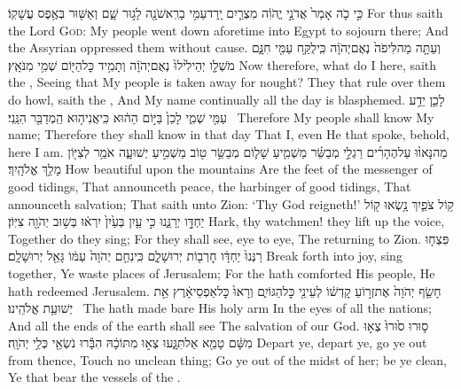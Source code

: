{כִּ֣י כֹ֤ה אָמַר֙ אֲדֹנָ֣י יֱהֹוִ֔ה מִצְרַ֛יִם יָֽרַד\maqqaf עַמִּ֥י בָרִֽאשֹׁנָ֖ה לָג֣וּר שָׁ֑ם וְאַשּׁ֖וּר בְּאֶ֥פֶס עֲשָׁקֽוֹ׃}
{For thus saith the Lord \textsc{God}: My people went down aforetime into Egypt to sojourn there; And the Assyrian oppressed them without cause.}
{וְעַתָּ֤ה מַה\maqqaf לִּי\maqqaf פֹה֙ נְאֻם\maqqaf יְהֹוָ֔ה כִּֽי\maqqaf לֻקַּ֥ח עַמִּ֖י חִנָּ֑ם מֹשְׁלָ֤ו יְהֵילִ֙ילוּ֙ נְאֻם\maqqaf יְהֹוָ֔ה וְתָמִ֥יד כׇּל\maqqaf הַיּ֖וֹם שְׁמִ֥י מִנֹּאָֽץ׃}
{Now therefore, what do I here, saith the \lord, Seeing that My people is taken away for nought? They that rule over them do howl, saith the \lord, And My name continually all the day is blasphemed.}
{לָכֵ֛ן יֵדַ֥ע עַמִּ֖י שְׁמִ֑י לָכֵן֙ בַּיּ֣וֹם הַה֔וּא כִּֽי\maqqaf אֲנִי\maqqaf ה֥וּא הַֽמְדַבֵּ֖ר הִנֵּֽנִי׃ \setuma }
{Therefore My people shall know My name; Therefore they shall know in that day That I, even He that spoke, behold, here I am.}
{מַה\maqqaf נָּאו֨וּ עַל\maqqaf הֶהָרִ֜ים רַגְלֵ֣י מְבַשֵּׂ֗ר מַשְׁמִ֧יעַ שָׁל֛וֹם מְבַשֵּׂ֥ר ט֖וֹב מַשְׁמִ֣יעַ יְשׁוּעָ֑ה אֹמֵ֥ר לְצִיּ֖וֹן מָלַ֥ךְ אֱלֹהָֽיִךְ׃}
{How beautiful upon the mountains Are the feet of the messenger of good tidings, That announceth peace, the harbinger of good tidings, That announceth salvation; That saith unto Zion: ‘Thy God reigneth!’}
{ק֥וֹל צֹפַ֛יִךְ נָ֥שְׂאוּ ק֖וֹל יַחְדָּ֣ו יְרַנֵּ֑נוּ כִּ֣י עַ֤יִן בְּעַ֙יִן֙ יִרְא֔וּ בְּשׁ֥וּב יְהֹוָ֖ה צִיּֽוֹן׃}
{Hark, thy watchmen! they lift up the voice, Together do they sing; For they shall see, eye to eye, The \lord\space returning to Zion.}
{פִּצְח֤וּ רַנְּנוּ֙ יַחְדָּ֔ו חׇרְב֖וֹת יְרוּשָׁלָ֑͏ִם כִּֽי\maqqaf נִחַ֤ם יְהֹוָה֙ עַמּ֔וֹ גָּאַ֖ל יְרוּשָׁלָֽ͏ִם׃}
{Break forth into joy, sing together, Ye waste places of Jerusalem; For the \lord\space hath comforted His people, He hath redeemed Jerusalem.}
{חָשַׂ֤ף יְהֹוָה֙ אֶת\maqqaf זְר֣וֹעַ קׇדְשׁ֔וֹ לְעֵינֵ֖י כׇּל\maqqaf הַגּוֹיִ֑ם וְרָאוּ֙ כׇּל\maqqaf אַפְסֵי\maqqaf אָ֔רֶץ אֵ֖ת יְשׁוּעַ֥ת אֱלֹהֵֽינוּ׃ \setuma }
{The \lord\space hath made bare His holy arm In the eyes of all the nations; And all the ends of the earth shall see The salvation of our God.}
{ס֤וּרוּ ס֙וּרוּ֙ צְא֣וּ מִשָּׁ֔ם טָמֵ֖א אַל\maqqaf תִּגָּ֑עוּ צְא֣וּ מִתּוֹכָ֔הּ הִבָּ֕רוּ נֹשְׂאֵ֖י כְּלֵ֥י יְהֹוָֽה׃}
{Depart ye, depart ye, go ye out from thence, Touch no unclean thing; Go ye out of the midst of her; be ye clean, Ye that bear the vessels of the \lord.}
